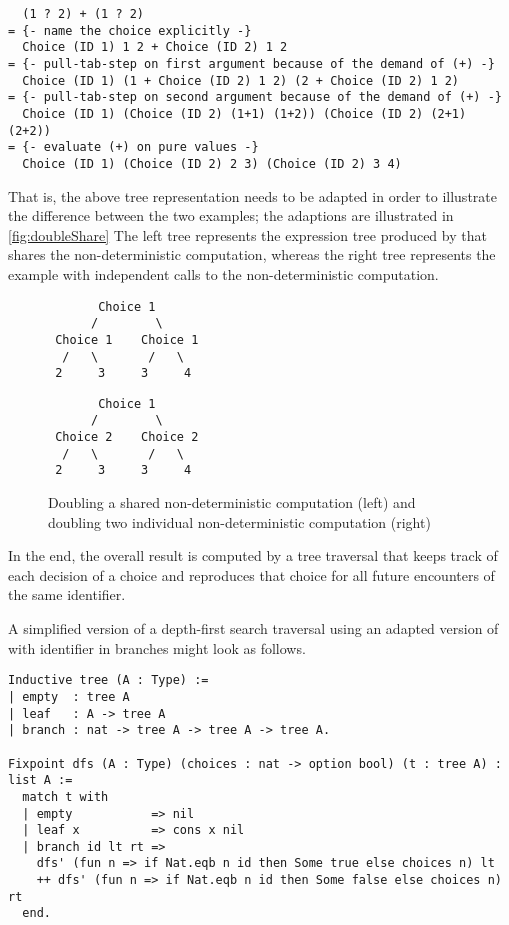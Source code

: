 \begin{verbatim}
  (1 ? 2) + (1 ? 2)
= {- name the choice explicitly -}
  Choice (ID 1) 1 2 + Choice (ID 2) 1 2
= {- pull-tab-step on first argument because of the demand of (+) -}
  Choice (ID 1) (1 + Choice (ID 2) 1 2) (2 + Choice (ID 2) 1 2)
= {- pull-tab-step on second argument because of the demand of (+) -}
  Choice (ID 1) (Choice (ID 2) (1+1) (1+2)) (Choice (ID 2) (2+1) (2+2))
= {- evaluate (+) on pure values -}
  Choice (ID 1) (Choice (ID 2) 2 3) (Choice (ID 2) 3 4)
\end{verbatim}

That is, the above tree representation needs to be adapted in order to
illustrate the difference between the two examples; the adaptions are
illustrated in \autoref{fig:doubleShare}
The left tree represents the expression tree produced by
 that shares the non-deterministic computation,
whereas the right tree represents the example  with
independent calls to the non-deterministic computation.

\begin{figure}[t]
\begin{minipage}{0.49\textwidth}
\begin{verbatim}
       Choice 1
      /        \
 Choice 1    Choice 1
  /   \       /   \
 2     3     3     4
\end{verbatim}
\end{minipage}
\begin{minipage}{0.49\textwidth}
\begin{verbatim}
       Choice 1
      /        \
 Choice 2    Choice 2
  /   \       /   \
 2     3     3     4
\end{verbatim}
\end{minipage}
\caption{Doubling a shared non-deterministic computation (left) and doubling two
  individual non-deterministic computation (right)}
\label{fig:doubleShare}
\end{figure}

In the end, the overall result is computed by a tree traversal that
keeps track of each decision of a choice and reproduces that
choice for all future encounters of the same identifier.

A simplified version of a depth-first search traversal using an
adapted version of \cinl{tree} with identifier in branches might look
as follows.

\begin{verbatim}
Inductive tree (A : Type) :=
| empty  : tree A
| leaf   : A -> tree A
| branch : nat -> tree A -> tree A -> tree A.

Fixpoint dfs (A : Type) (choices : nat -> option bool) (t : tree A) : list A :=
  match t with
  | empty           => nil
  | leaf x          => cons x nil
  | branch id lt rt =>
    dfs' (fun n => if Nat.eqb n id then Some true else choices n) lt
    ++ dfs' (fun n => if Nat.eqb n id then Some false else choices n) rt
  end.
\end{verbatim}

